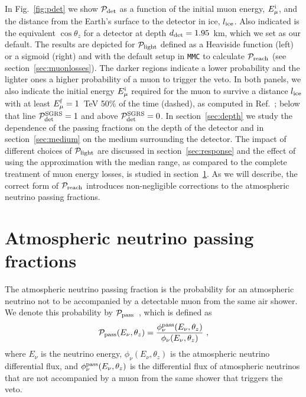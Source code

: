 \documentclass[aps,prd,showpacs,letterpaper,onecolumn,longbibliography,superscriptaddress,notitlepage,nofootinbib]{revtex4-1}%
\newcommand{\Emf}{E_{\mu}^{\rm f}}
\newcommand{\Emi}{E_{\mu}^{\rm i}}
\newcommand{\Prob}{{\cal P}}
\newcommand{\MMC}{\texttt{MMC}}
\begin{document}
In Fig.~\ref{fig:pdet} we show $\Prob_{\rm det}$ as a function of the initial muon energy, $\Emi$, and the distance from the Earth's surface to the detector in ice, $l_{\rm ice}$. Also indicated is the equivalent $\cos \theta_z$ for a detector at depth $d_{\rm det} = 1.95$~km, which we set as our default. The results are depicted for $\Prob_{\rm light}$ defined as a Heaviside function (left) or a sigmoid (right) and with the default setup in \MMC{} to calculate $\Prob_{\rm reach}$ (see section~\ref{sec:muonlosses}). The darker regions indicate a lower probability and the lighter ones a higher probability of a muon to trigger the veto. In both panels, we also indicate the initial energy $\Emi$ required for the muon to survive a distance $l_{\rm ice}$ with at least $\Emf = 1$~TeV 50\% of the time (dashed), as computed in Ref.~\cite{Gaisser:2014bja}; below that line $\Prob_{\rm det}^{\rm SGRS} = 1$ and above $\Prob_{\rm det}^{\rm SGRS} = 0$. In section~\ref{sec:depth} we study the dependence of the passing fractions on the depth of the detector and in section~\ref{sec:medium} on the medium surrounding the detector. The impact of different choices of $\Prob_{\rm light}$ are discussed in section~\ref{sec:response} and the effect of using the approximation with the median range, as compared to the complete treatment of muon energy losses, is studied in section~\ref{sec:pf}. As we will describe, the correct form of $\Prob_{\rm reach}$ introduces non-negligible corrections to the atmospheric neutrino passing fractions.

\section{Atmospheric neutrino passing fractions}
\label{sec:pf}

The atmospheric neutrino passing fraction is the probability for an atmospheric neutrino not to be accompanied by a detectable muon from the same air shower. We denote this probability by $\Prob_{\rm pass}$~\cite{Schonert:2008is, Gaisser:2014bja}, which is defined as
%
\begin{equation}
\Prob_{\rm pass} (E_\nu, \theta_z) = \frac{\phi_\nu^{\rm pass}(E_\nu, \theta_z)}{\phi_\nu(E_\nu, \theta_z)} ~,
\end{equation}
%
where $E_\nu$ is the neutrino energy, $\phi_\nu(E_\nu, \theta_z)$ is the atmospheric neutrino differential flux, and $\phi_\nu^{\rm pass}(E_\nu, \theta_z)$ is the differential flux of atmospheric neutrinos that are not accompanied by a muon from the same shower that triggers the veto.
\end{document}
